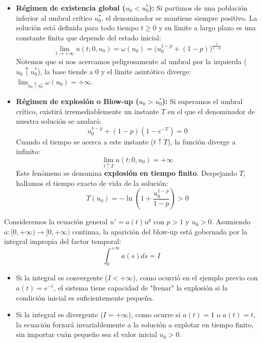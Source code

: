 {    \begin{itemize}
        \item \textbf{Régimen de existencia global ($u_0 < u_0^*$):} Si partimos de una población inferior al umbral crítico $u_0^*$, el denominador se mantiene siempre positivo. La solución está definida para todo tiempo $t \geq 0$ y su límite a largo plazo es una constante finita que depende del estado inicial:
        \[
            \lim_{t \to +\infty} u(t;0,u_0) = \omega(u_0) = \Big( u_0^{1-p} + (1-p) \Big)^{\frac{1}{1-p}}
        \]
        Notemos que si nos acercamos peligrosamente al umbral por la izquierda ($u_0 \uparrow u_0^*$), la base tiende a $0$ y el límite asintótico diverge: $\lim_{u_0 \uparrow u_0^*} \omega(u_0) = +\infty$.

        \item \textbf{Régimen de explosión o Blow-up ($u_0 > u_0^*$):} Si superamos el umbral crítico, existirá irremediablemente un instante $T$ en el que el denominador de nuestra solución se anulará:
        \[
            u_0^{1-p} + (1-p)(1 - e^{-T}) = 0
        \]
        Cuando el tiempo se acerca a este instante ($t \uparrow T$), la función diverge a infinito:
        \[
            \lim_{t \uparrow T} u(t;0,u_0) = +\infty
        \]
        Este fenómeno se denomina \textbf{explosión en tiempo finito}. Despejando $T$, hallamos el tiempo exacto de vida de la solución:
        \[
            T(u_0) = -\ln\left( 1 + \frac{u_0^{1-p}}{1-p} \right) > 0
        \]
    \end{itemize}
}

\begin{observación}
    Consideremos la ecuación general $u' = a(t) u^p$ con $p > 1$ y $u_0 > 0$. Asumiendo $a: [0, +\infty) \to [0, +\infty)$ continua, la aparición del blow-up está gobernada por la integral impropia del factor temporal:
    \[
        \int_0^{+\infty} a(s) ds = I
    \]
    \begin{itemize}
        \item Si la integral es convergente ($I < +\infty$), como ocurrió en el ejemplo previo con $a(t) = e^{-t}$, el sistema tiene capacidad de "frenar" la explosión si la condición inicial es suficientemente pequeña.
        \item Si la integral es divergente ($I = +\infty$), como ocurre si $a(t) = 1$ o $a(t) = t$, la ecuación forzará invariablemente a la solución a explotar en tiempo finito, sin importar cuán pequeño sea el valor inicial $u_0 > 0$.
    \end{itemize}
\end{observación}

